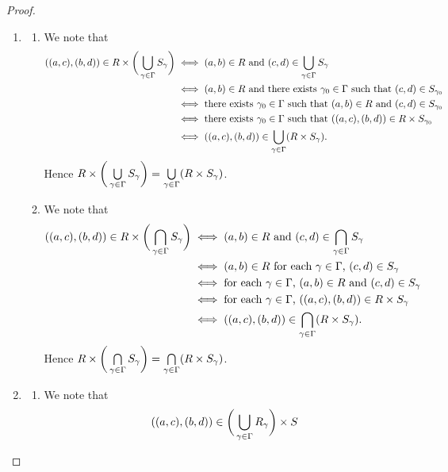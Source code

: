 \begin{proof}\
	\begin{enumerate}
		\item 
		\begin{enumerate}
			\item We note that
			\begin{align*}
				((a,c),(b,d)) \in R \times  \bigg(\bigcup\limits_{\gamma \in \Gamma} S_{\gamma} \bigg) 
				& \iff \text{$(a,b) \in R$ and $(c,d) \in \bigcup\limits_{\gamma \in \Gamma} S_{\gamma}$} \\
				& \iff \text{$(a,b) \in R$ and there exists $\gamma_0 \in \Gamma$ such that $(c,d) \in S_{\gamma_0}$} \\
				& \iff \text{there exists $\gamma_0 \in \Gamma$ such that $(a,b) \in R$ and $(c,d) \in S_{\gamma_0}$} \\
				& \iff \text{there exists $\gamma_0 \in \Gamma$ such that $((a,c), (b,d)) \in R \times  S_{\gamma_0}$} \\
				& \iff ((a,c), (b,d)) \in \bigcup\limits_{\gamma \in \Gamma} (R \times  S_{\gamma}). 
			\end{align*}
			Hence $R \times  \bigg(\bigcup\limits_{\gamma \in \Gamma} S_{\gamma} \bigg) = \bigcup\limits_{\gamma \in \Gamma} (R \times  S_{\gamma})$.
			\item We note that
			\begin{align*}
				((a,c),(b,d)) \in R \times  \bigg(\bigcap\limits_{\gamma \in \Gamma} S_{\gamma} \bigg) 
				& \iff \text{$(a,b) \in R$ and $(c,d) \in \bigcap\limits_{\gamma \in \Gamma} S_{\gamma}$} \\
				& \iff \text{$(a,b) \in R$ for each $\gamma \in \Gamma$, $(c,d) \in S_{\gamma}$} \\
				& \iff \text{for each $\gamma \in \Gamma$, $(a,b) \in R$ and $(c,d) \in S_{\gamma}$} \\
				& \iff \text{for each $\gamma \in \Gamma$, $((a,c), (b,d)) \in R \times  S_{\gamma}$} \\
				& \iff ((a,c), (b,d)) \in \bigcap\limits_{\gamma \in \Gamma} (R \times  S_{\gamma}). 
			\end{align*}
			Hence $R \times  \bigg(\bigcap\limits_{\gamma \in \Gamma} S_{\gamma} \bigg) = \bigcap\limits_{\gamma \in \Gamma} (R \times  S_{\gamma})$.
		\end{enumerate}
		\item 
		\begin{enumerate}
			\item We note that
			\begin{align*}
				((a,c), (b,d)) \in \bigg( \bigcup\limits_{\gam \in \Gam} R_{\gam}\bigg) \times S

\end{align*}
\end{enumerate}
\end{enumerate}
\end{proof}
